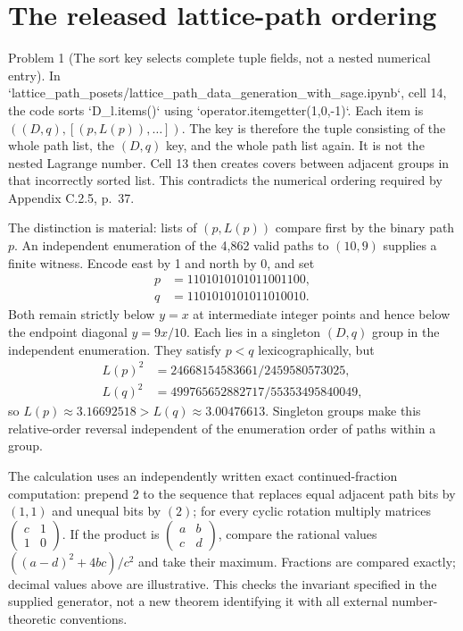 \documentclass[10pt]{article}
\begin{document}
\section*{The released lattice-path ordering}
Problem 1 (The sort key selects complete tuple fields, not a nested numerical entry).  In `lattice\_path\_posets/lattice\_path\_data\_generation\_with\_sage.ipynb`, cell 14, the code sorts `D\_l.items()` using `operator.itemgetter(1,0,-1)`. Each item is \(((D,q),[(p,L(p)),\ldots])\). The key is therefore the tuple consisting of the whole path list, the \((D,q)\) key, and the whole path list again. It is not the nested Lagrange number. Cell 13 then creates covers between adjacent groups in that incorrectly sorted list. This contradicts the numerical ordering required by Appendix C.2.5, p. 37.\par
The distinction is material: lists of \((p,L(p))\) compare first by the binary path \(p\). An independent enumeration of the 4,862 valid paths to \((10,9)\) supplies a finite witness. Encode east by 1 and north by 0, and set \[\begin{aligned}
 p&=1101010101011001100,\\
 q&=1101010101011010010.\end{aligned}\] Both remain strictly below \(y=x\) at intermediate integer points and hence below the endpoint diagonal \(y=9x/10\). Each lies in a singleton \((D,q)\) group in the independent enumeration. They satisfy \(p<q\) lexicographically, but \[\begin{aligned}
 L(p)^2&=24668154583661/2459580573025,\\
 L(q)^2&=499765652882717/55353495840049,\end{aligned}\] so \(L(p)\approx3.16692518>L(q)\approx3.00476613\). Singleton groups make this relative-order reversal independent of the enumeration order of paths within a group.\par
The calculation uses an independently written exact continued-fraction computation: prepend 2 to the sequence that replaces equal adjacent path bits by \((1,1)\) and unequal bits by \((2)\); for every cyclic rotation multiply matrices \(\left(\begin{smallmatrix}c&1\\1&0\end{smallmatrix}\right)\). If the product is \(\left(\begin{smallmatrix}a&b\\c&d\end{smallmatrix}\right)\), compare the rational values \(((a-d)^2+4bc)/c^2\) and take their maximum. Fractions are compared exactly; decimal values above are illustrative. This checks the invariant specified in the supplied generator, not a new theorem identifying it with all external number-theoretic conventions.\par
\end{document}
